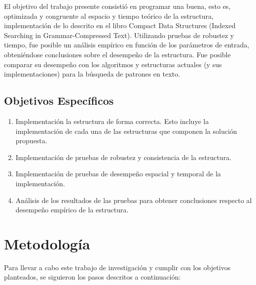 El objetivo del trabajo presente consistió en programar una buena, esto es, optimizada y congruente al espacio y tiempo teórico de la estructura, implementación de lo descrito en el libro Compact Data Structures (Indexed Searching in Grammar-Compressed Text)\cite[1, Capítulo 10.5.6]{Navarro}. Utilizando pruebas de robustez y tiempo, fue posible un análisis empírico en función de los parámetros de entrada, obteniéndose conclusiones sobre el desempeño de la estructura. Fue posible comparar su desempeño con los algoritmos y estructuras actuales (y sus implementaciones) para la
búsqueda de patrones en texto.

\subsection*{Objetivos Específicos}\label{sec:obj-e}
  
\begin{enumerate}
  \item Implementación la estructura de forma correcta. Esto incluye la implementación de cada una de las estructuras que componen la solución propuesta.
  \item Implementación de pruebas de robustez y consistencia de la estructura.
  \item Implementación de pruebas de desempeño espacial y temporal de la implementación.
  \item Análisis de los resultados de las pruebas para obtener conclusiones respecto al desempeño
empírico de la estructura.
\end{enumerate}

\section{Metodología}\label{sec:metodologia}

Para llevar a cabo este trabajo de investigación y cumplir con los objetivos planteados, se siguieron los pasos descritos a continuación:

